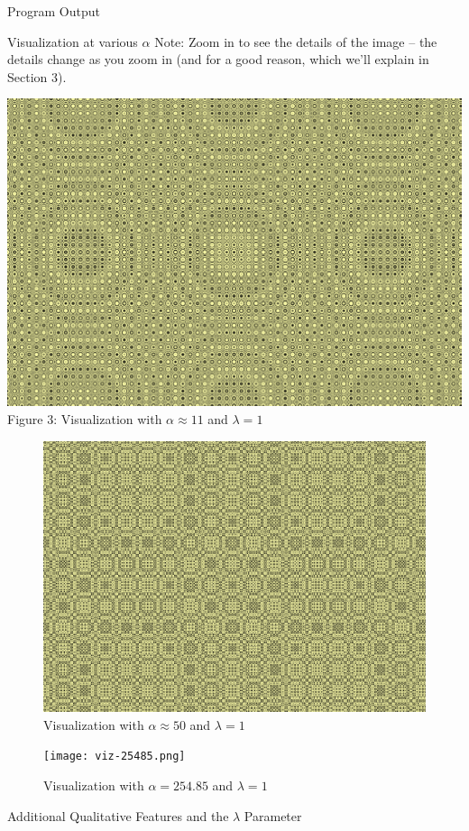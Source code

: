 \documentclass[11pt]{article}
\begin{document}
\begin{section}{Program Output}
\begin{subsection}{Visualization at various $\alpha$}
Note: Zoom in to see the details of the image -- the details change as you zoom in (and for a good reason, which we'll explain in Section 3).
\begin{center}
\includegraphics[width=.9\textwidth]{viz-11.png}\\
Figure 3: Visualization with $\alpha \approx 11$ and $\lambda = 1$
\label{fig:viz11}
\end{center}
\begin{figure}[h]
\centering
\includegraphics[width=.9\textwidth]{viz-50.png}
\caption{Visualization with $\alpha \approx 50$ and $\lambda = 1$}
\label{fig:viz50}
\end{figure}
\begin{figure}[h]
\centering
\texttt{[image: viz-25485.png]}
\caption{Visualization with $\alpha = 254.85$ and $\lambda = 1$}
\label{fig:viz25485}
\end{figure}


\end{subsection}
\end{section}
\clearpage
\begin{section}{Additional Qualitative Features and the $\lambda$ Parameter}
\end{section}
\end{document}
